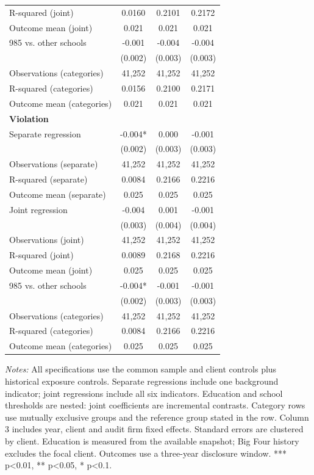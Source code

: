 \documentclass[10pt]{article}
\begin{document}
\begin{minipage}{19cm}
\begin{threeparttable}
\begin{tabular}{p{}ccc}
R-squared (joint) & 0.0160 & 0.2101 & 0.2172 \\
Outcome mean (joint) & 0.021 & 0.021 & 0.021 \\
985 vs. other schools & -0.001 & -0.004 & -0.004 \\
 & (0.002) & (0.003) & (0.003) \\
Observations (categories) & 41,252 & 41,252 & 41,252 \\
R-squared (categories) & 0.0156 & 0.2100 & 0.2171 \\
Outcome mean (categories) & 0.021 & 0.021 & 0.021 \\
\multicolumn{4}{l}{\textbf{Violation}} \\
Separate regression & -0.004* & 0.000 & -0.001 \\
 & (0.002) & (0.003) & (0.003) \\
Observations (separate) & 41,252 & 41,252 & 41,252 \\
R-squared (separate) & 0.0084 & 0.2166 & 0.2216 \\
Outcome mean (separate) & 0.025 & 0.025 & 0.025 \\
Joint regression & -0.004 & 0.001 & -0.001 \\
 & (0.003) & (0.004) & (0.004) \\
Observations (joint) & 41,252 & 41,252 & 41,252 \\
R-squared (joint) & 0.0089 & 0.2168 & 0.2216 \\
Outcome mean (joint) & 0.025 & 0.025 & 0.025 \\
985 vs. other schools & -0.004* & -0.001 & -0.001 \\
 & (0.002) & (0.003) & (0.003) \\
Observations (categories) & 41,252 & 41,252 & 41,252 \\
R-squared (categories) & 0.0084 & 0.2166 & 0.2216 \\
Outcome mean (categories) & 0.025 & 0.025 & 0.025 \\
\bottomrule
\end{tabular}
\begin{tablenotes}\fontsize{9}{11}\selectfont
\item \raggedright \fontsize{9}{11}\selectfont \textit{Notes:} All specifications use the common sample and client controls plus historical exposure controls. Separate regressions include one background indicator; joint regressions include all six indicators. Education and school thresholds are nested: joint coefficients are incremental contrasts. Category rows use mutually exclusive groups and the reference group stated in the row. Column 3 includes year, client and audit firm fixed effects. Standard errors are clustered by client. Education is measured from the available snapshot; Big Four history excludes the focal client. Outcomes use a three-year disclosure window. *** p<0.01, ** p<0.05, * p<0.1.
\end{tablenotes}
\end{threeparttable}

\end{minipage}
\end{document}

